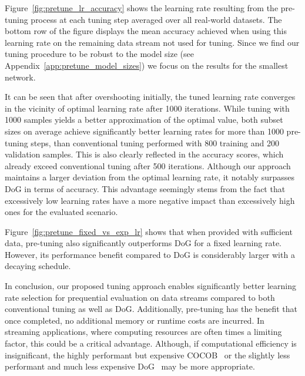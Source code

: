 \documentclass[letterpaper]{article} %
\begin{document}
Figure~\ref{fig:pretune_lr_accuracy} shows the learning rate resulting from the pre-tuning process at each tuning step averaged over all real-world datasets.
The bottom row of the figure displays the mean accuracy achieved when using this learning rate on the remaining data stream not used for tuning.
Since we find our tuning procedure to be robust to the model size (see Appendix~\ref{app:pretune_model_sizes}) we focus on the results for the smallest network.

It can be seen that after overshooting initially, the tuned learning rate converges in the vicinity of optimal learning rate after 1000 iterations.
While tuning with 1000 samples yields a better approximation of the optimal value, both subset sizes on average achieve significantly better learning rates for more than 1000 pre-tuning steps, than conventional tuning performed with 800 training and 200 validation samples.
This is also clearly reflected in the accuracy scores, which already exceed conventional tuning after 500 iterations.
Although our approach maintains a larger deviation from the optimal learning rate, it notably surpasses DoG in terms of accuracy.
This advantage seemingly stems from the fact that excessively low learning rates have a more negative impact than excessively high ones for the evaluated scenario.

Figure~\ref{fig:pretune_fixed_vs_exp_lr} shows that when provided with sufficient data, pre-tuning also significantly outperforms DoG for a fixed learning rate.
However, its performance benefit compared to DoG is considerably larger with a decaying schedule.

In conclusion, our proposed tuning approach enables significantly better learning rate selection for prequential evaluation on data streams compared to both conventional tuning as well as DoG.
Additionally, pre-tuning has the benefit that once completed, no additional memory or runtime costs are incurred.
In streaming applications, where computing resources are often times a limiting factor, this could be a critical advantage.
Although, if computational efficiency is insignificant, the highly performant but expensive COCOB~\cite{orabonaTrainingDeepNetworks2017} or the slightly less performant and much less expensive DoG~\cite{ivgiDoGSGDBest2023} may be more appropriate.





\end{document}
